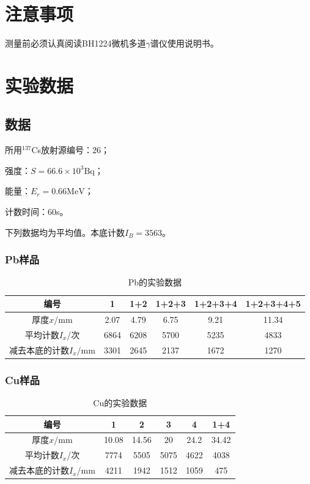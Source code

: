\documentclass[a4paper]{article}
\begin{document}
\section{注意事项}
测量前必须认真阅读BH1224微机多道$\gamma$谱仪使用说明书。

\section{实验数据}
\subsection{数据}
所用$^{137}$Cs放射源编号：26；

强度：$S = 66.6\times 10^3\text{Bq}$；

能量：$E_r = 0.66\text{MeV}$；

计数时间：60s。

下列数据均为平均值。本底计数$I_B = 3563$。%

\subsubsection{Pb样品}
\begin{table}[!h]
\centering
\begin{tabular}{|c|c|c|c|c|c|}
\hline
编号	&	1	&	1+2	&	1+2+3	&	1+2+3+4	&	1+2+3+4+5 \\ \hline
厚度$x$/mm	&	2.07	&	4.79	&	6.75	&	9.21	&	11.34 \\ \hline
平均计数$I_x$/次	&	6864	&	6208	&	5700	&	5235	&	4833 \\ \hline
减去本底的计数$I_x$/mm & 3301 & 2645 & 2137 & 1672 & 1270\\ \hline
\end{tabular}
\caption{Pb的实验数据}\label{data:Pb}
\end{table}
\subsubsection{Cu样品}
\begin{table}[!h]
\centering
\begin{tabular}{|c|c|c|c|c|c|}
\hline
编号	&	1	&	2	&	3	&	4	&	1+4\\ \hline
厚度$x$/mm	&	10.08	&	14.56	&	20	&	24.2	&	34.42\\ \hline
平均计数$I_x$/次	&	7774	&	5505	&	5075	&	4622	&	4038\\ \hline
减去本底的计数$I_x$/mm & 4211 & 1942 & 1512 & 1059 & 475\\ \hline
\end{tabular}
\caption{Cu的实验数据}\label{data:Cu}
\end{table}
\end{document}
